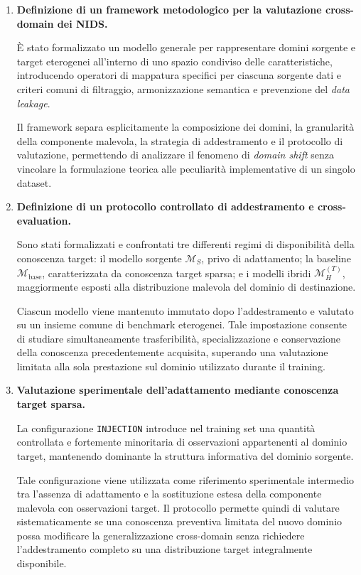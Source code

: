 \begin{enumerate}

    \item \textbf{Definizione di un framework metodologico per la valutazione cross-domain dei NIDS.}
    
    È stato formalizzato un modello generale per rappresentare domini sorgente e target eterogenei all'interno di uno spazio condiviso delle caratteristiche, introducendo operatori di mappatura specifici per ciascuna sorgente dati e criteri comuni di filtraggio, armonizzazione semantica e prevenzione del \textit{data leakage}.
    
    Il framework separa esplicitamente la composizione dei domini, la granularità della componente malevola, la strategia di addestramento e il protocollo di valutazione, permettendo di analizzare il fenomeno di \textit{domain shift} senza vincolare la formulazione teorica alle peculiarità implementative di un singolo dataset.

    \item \textbf{Definizione di un protocollo controllato di addestramento e cross-evaluation.}
    
    Sono stati formalizzati e confrontati tre differenti regimi di disponibilità della conoscenza target: il modello sorgente $\mathcal{M}_{S}$, privo di adattamento; la baseline $\mathcal{M}_{\mathrm{base}}$, caratterizzata da conoscenza target sparsa; e i modelli ibridi $\mathcal{M}_{H}^{(T)}$, maggiormente esposti alla distribuzione malevola del dominio di destinazione.
    
    Ciascun modello viene mantenuto immutato dopo l'addestramento e valutato su un insieme comune di benchmark eterogenei. 
    Tale impostazione consente di studiare simultaneamente trasferibilità, specializzazione e conservazione della conoscenza precedentemente acquisita, superando una valutazione limitata alla sola prestazione sul dominio utilizzato durante il training.

    \item \textbf{Valutazione sperimentale dell'adattamento mediante conoscenza target sparsa.}
    
    La configurazione \texttt{INJECTION} introduce nel training set una quantità controllata e fortemente minoritaria di osservazioni appartenenti al dominio target, mantenendo dominante la struttura informativa del dominio sorgente.
    
    Tale configurazione viene utilizzata come riferimento sperimentale intermedio tra l'assenza di adattamento e la sostituzione estesa della componente malevola con osservazioni target. 
    Il protocollo permette quindi di valutare sistematicamente se una conoscenza preventiva limitata del nuovo dominio possa modificare la generalizzazione cross-domain senza richiedere l'addestramento completo su una distribuzione target integralmente disponibile.


\end{enumerate}
